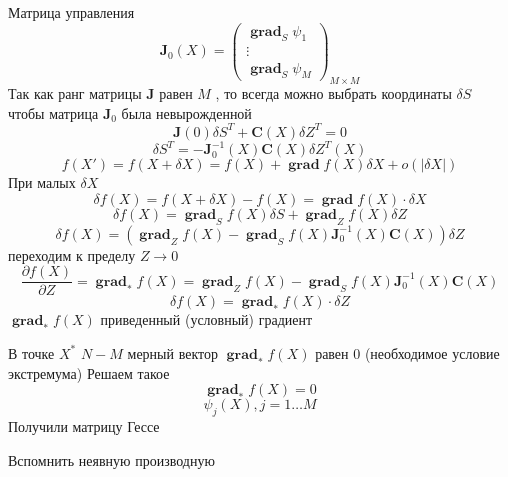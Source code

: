 \documentclass[14pt]{extarticle}
\DeclareMathOperator{\grad}{\textbf{grad}}
\begin{document}
     Матрица управления
     \begin{equation}
	     \mathbf{J}_{0}(X)
	     =
	     \begin{pmatrix} 
	     \grad_{S} \psi_{1} \\
	     \vdots\\
	     \grad_{S} \psi_{M}
	     \end{pmatrix} _{M \times M}
     \end{equation} 
     Так как ранг матрицы $\mathbf{J}$ равен
     $M$ , то всегда можно выбрать  координаты  $\delta S$ 
     чтобы матрица  $\mathbf{J}_{0}$ была невырожденной
     \begin{equation}
     \mathbf{J}(0) \delta S^{T} + \mathbf{C}(X) \delta Z^{T} = 0
     \end{equation} 
     \begin{equation}
     \delta S^{T} = - \mathbf{J}^{-1}_{0}(X) \mathbf{C}(X) \delta Z^{T}(X)
     \end{equation} 
     \begin{equation}
     f(X') = f(X + \delta X) = 
     f(X) + \grad f(X) \delta X + o(|\delta X|)
     \end{equation} 
     При малых $\delta X$
     \begin{equation}
     \delta f(X) = f(X + \delta X) - f(X)  = \grad f(X) \cdot \delta X
     \end{equation} 
     \begin{equation}
     \delta f(X) = \grad_{S} f(X) \delta S + \grad_{Z} f(X) \delta Z
     \end{equation} 
     \begin{equation}
     \delta f(X)  = (\grad_{Z} f(X) - \grad_{S} f(X) \mathbf{J}_{0}^{-1}(X) \mathbf{C}(X)) \delta Z
     \end{equation} 
     переходим к пределу $Z \to 0$
      \begin{equation}
     \frac{\partial f(X)}{\partial Z} = 
     \grad_{*} f(X)= 
     \grad_{Z} f(X) - \grad_{S} f(X) \mathbf{J}_{0}^{-1}(X) \mathbf{C}(X)
     \end{equation} 
     \begin{equation}
     \delta f(X) = \grad_{*} f(X) \cdot \delta Z
     \end{equation} 
     $\grad_{*} f(X)$ приведенный (условный) градиент


     В точке $X^{*}$ $N-M$ мерный вектор
      $\grad_{*} f(X)$ равен 0 (необходимое условие экстремума)
      Решаем такое
      \begin{equation}
      \grad_{*} f(X) = 0
      \end{equation} 
      \begin{equation}
      \psi_{j}(X), j = 1 \dots M
\end{equation} 
Получили матрицу Гессе

Вспомнить неявную производную
\end{document}
